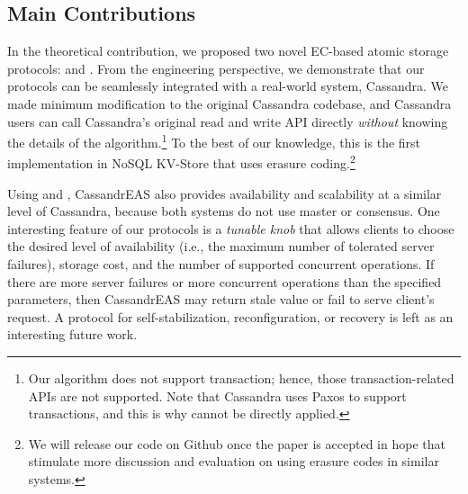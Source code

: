 \subsection*{Main Contributions}
In the theoretical contribution, we proposed two novel EC-based atomic storage protocols: \treasmod{} and \oreas. From the engineering perspective, we demonstrate that our protocols can be seamlessly integrated with a real-world system, Cassandra. We made minimum modification to the original Cassandra codebase, and Cassandra users can call Cassandra's original read and write API directly \textit{without} knowing the details of the algorithm.\footnote{Our algorithm does not support transaction; hence, those transaction-related APIs are not supported. Note that Cassandra uses Paxos \cite{paxos} to support transactions, and this is why \oreas{} cannot be directly applied.} 
To the best of our knowledge, this is the first implementation in NoSQL KV-Store that uses erasure coding.\footnote{We will release our code on Github once the paper is accepted in hope that stimulate more discussion and evaluation on using erasure codes in similar systems.} 

Using \treasmod{} and \oreas{}, CassandrEAS also provides availability and scalability at a similar level of Cassandra, because both systems do not use master or consensus.
One interesting feature of our protocols is a \textit{tunable knob} that allows clients to choose the desired level of availability (i.e., the maximum number of tolerated server failures), storage cost, and the number of supported concurrent operations. If there are more server failures or more concurrent operations than the specified parameters, then CassandrEAS may return stale value or fail to serve client's request. A protocol for self-stabilization, reconfiguration, or recovery is left as an interesting future work.

